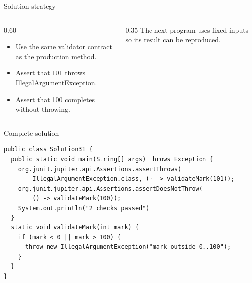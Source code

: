 \documentclass[10pt,aspectratio=169]{beamer}
\begin{document}
\begin{frame}[fragile,t]{Solution strategy}
\begin{columns}[T,onlytextwidth]\begin{column}{0.60\textwidth}
\begin{itemize}
\item Use the same validator contract as the production method.
\item Assert that 101 throws IllegalArgumentException.
\item Assert that 100 completes without throwing.
\end{itemize}
\end{column}\begin{column}{0.35\textwidth}\small
The next program uses fixed inputs so its result can be reproduced.
\end{column}\end{columns}
\end{frame}

\begin{frame}[fragile,t]{Complete solution}
\begin{lstlisting}
public class Solution31 {
  public static void main(String[] args) throws Exception {
    org.junit.jupiter.api.Assertions.assertThrows(
        IllegalArgumentException.class, () -> validateMark(101));
    org.junit.jupiter.api.Assertions.assertDoesNotThrow(
        () -> validateMark(100));
    System.out.println("2 checks passed");
  }
  static void validateMark(int mark) {
    if (mark < 0 || mark > 100) {
      throw new IllegalArgumentException("mark outside 0..100");
    }
  }
}
\end{lstlisting}
\end{frame}
\end{document}
